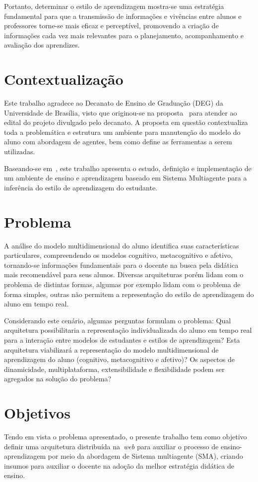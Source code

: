 Portanto, determinar o estilo de aprendizagem mostra-se uma estratégia fundamental para que a transmissão de informações e vivências entre alunos e professores torne-se mais eficaz e perceptível, promovendo a criação de informações cada vez mais relevantes para o planejamento, acompanhamento e avaliação dos aprendizes.

\section{Contextualização}
Este trabalho agradece ao Decanato de Ensino de Graduação (DEG) da Universidade de Brasília, visto que originou-se na proposta~\cite{editalFrank} para atender ao edital do projeto divulgado pelo decanato. A proposta em questão contextualiza toda a problemática e estrutura um ambiente para manutenção do modelo do aluno com abordagem de agentes, bem como define as ferramentas a serem utilizadas.

Baseando-se em~\cite{editalFrank}, este trabalho apresenta o estudo, definição e implementação de um ambiente de ensino e aprendizagem baseado em Sistema Multiagente para a inferência do estilo de aprendizagem do estudante.

\section{Problema}
A análise do modelo multidimensional do aluno identifica suas características particulares, compreendendo os modelos cognitivo, metacognitivo e afetivo, tornando-se informações fundamentais para o docente na busca pela didática mais recomendável para seus alunos. Diversas arquiteturas porém lidam com o problema de distintas formas, algumas por exemplo lidam com o problema de forma simples, outras não permitem a representação do estilo de aprendizagem do aluno em tempo real.

Considerando este cenário, algumas perguntas formulam o problema: Qual arquitetura possibilitaria a representação individualizada do aluno em tempo real para a interação entre modelos de estudantes e estilos de aprendizagem? Esta arquitetura viabilizará a representação do modelo multidimensional de aprendizagem do aluno (cognitivo, metacognitivo e afetivo)? Os aspectos de dinamicidade, multiplataforma, extensibilidade e flexibilidade podem ser agregados na solução do problema?

\section{Objetivos}
Tendo em vista o problema apresentado, o presente trabalho tem como objetivo definir uma arquitetura distribuída na~\emph{web} para auxiliar o processo de ensino-aprendizagem por meio da abordagem de Sistema multiagente (SMA), criando insumos para auxiliar o docente na adoção da melhor estratégia didática de ensino.

